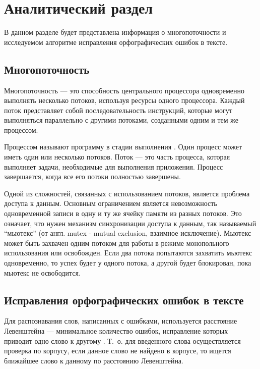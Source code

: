 \chapter{Аналитический раздел}

В данном разделе будет представлена информация о многопоточности и исследуемом алгоритме исправления орфографических ошибок в тексте.

\section{Многопоточность} 

Многопоточность \cite{multithreading} --- это способность центрального процессора одновременно выполнять несколько потоков, используя ресурсы одного процессора. Каждый поток представляет собой последовательность инструкций, которые могут выполняться параллельно с другими потоками, созданными одним и тем же процессом.

Процессом называют программу в стадии выполнения \cite{process}. Один процесс может иметь один или несколько потоков. Поток --- это часть процесса, которая выполняет задачи, необходимые для выполнения приложения. Процесс завершается, когда все его потоки полностью завершены. 

Одной из сложностей, связанных с использованием потоков, является проблема доступа к данным. 
Основным ограничением является невозможность одновременной записи в одну и ту же ячейку памяти из разных потоков.
Это означает, что нужен механизм синхронизации доступа к данным, так называемый “мьютекс” (от англ. mutex - mutual exclusion, взаимное исключение). 
Мьютекс может быть захвачен одним потоком для работы в режиме монопольного использования или освобожден. Если два потока попытаются захватить мьютекс одновременно, то успех будет у одного потока, а другой будет блокирован, пока мьютекс не освободится.

\section{Исправления орфографических ошибок в тексте}

Для распознавания слов, написанных с ошибками, используется расстояние
Левенштейна --- минимальное количество ошибок, исправление которых приводит
одно слово к другому \cite{miem}. 
Т.~о. для введенного слова осуществляется проверка по корпусу, если данное слово не найдено в корпусе, то ищется ближайшее слово к данному по расстоянию Левенштейна. 

